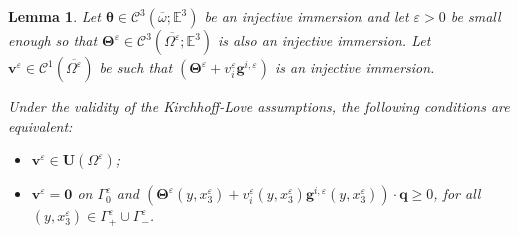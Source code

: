 \documentclass{amsart}
\newtheorem{lemma}{Lemma}[section]
\begin{document}
\begin{lemma}
	\label{Signorini}
	Let $\bm{\theta}\in\mathcal{C}^3(\overline{\omega};\mathbb{E}^3)$ be an injective immersion and let $\varepsilon>0$ be small enough so that $\bm{\Theta}^\varepsilon\in\mathcal{C}^3(\overline{\Omega^\varepsilon};\mathbb{E}^3)$ is also an injective immersion.
	Let $\bm{v}^\varepsilon \in \bm{\mathcal{C}}^1(\overline{\Omega^\varepsilon})$ be such that $(\bm{\Theta}^\varepsilon+v_i^\varepsilon\bm{g}^{i,\varepsilon})$ is an injective immersion.
	
	Under the validity of the Kirchhoff-Love assumptions, the following conditions are equivalent:
	\begin{itemize}
		\item[(i)] $\bm{v}^\varepsilon \in \bm{U}(\Omega^\varepsilon)$;
		\item[(ii)] $\bm{v}^\varepsilon=\bm{0}$ on $\Gamma_0^\varepsilon$ and $(\bm{\Theta}^\varepsilon(y,x_3^\varepsilon) +v_i^\varepsilon(y,x_3^\varepsilon)\bm{g}^{i,\varepsilon}(y,x_3^\varepsilon)) \cdot\bm{q}\ge 0$, for all $(y,x_3^\varepsilon) \in \Gamma^\varepsilon_+ \cup \Gamma^\varepsilon_{-}$.
	\end{itemize}
\end{lemma}
\end{document}
